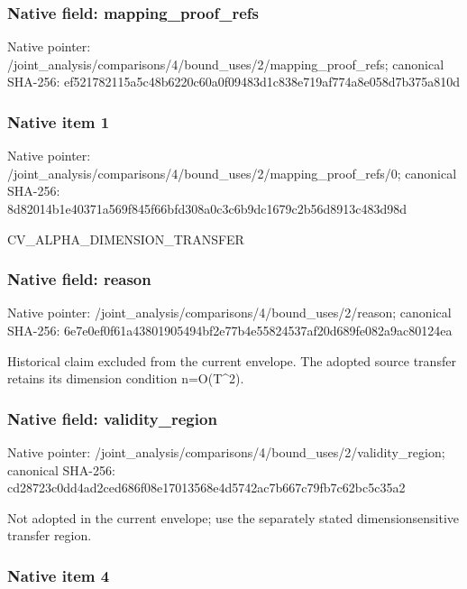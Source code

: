 \documentclass[10pt,a4paper]{article}
\begin{document}
\subsubsection{Native field: mapping\_proof\_refs}


Native pointer: /joint\_analysis/comparis\allowbreak{}ons/4/bound\_uses/2/mappi\allowbreak{}ng\_proof\_refs; canonical SHA-256: ef521782115a5c48b6220c60\allowbreak{}a0f09483d1c838e719af774a\allowbreak{}8e058d7b375a810d



\subsubsection{Native item 1}


Native pointer: /joint\_analysis/comparis\allowbreak{}ons/4/bound\_uses/2/mappi\allowbreak{}ng\_proof\_refs/0; canonical SHA-256: 8d82014b1e40371a569f845f\allowbreak{}66bfd308a0c3c6b9dc1679c2\allowbreak{}b56d8913c483d98d


CV\_ALPHA\_DIMENSION\_TRANSFER


\subsubsection{Native field: reason}


Native pointer: /joint\_analysis/comparis\allowbreak{}ons/4/bound\_uses/2/reaso\allowbreak{}n; canonical SHA-256: 6e7e0ef0f61a43801905494b\allowbreak{}f2e77b4e55824537af20d689\allowbreak{}fe082a9ac80124ea


Historical claim excluded from the current envelope. The adopted source transfer retains its dimension condition n=O(T\textasciicircum{}2).


\subsubsection{Native field: validity\_region}


Native pointer: /joint\_analysis/comparis\allowbreak{}ons/4/bound\_uses/2/valid\allowbreak{}ity\_region; canonical SHA-256: cd28723c0dd4ad2ced686f08\allowbreak{}e17013568e4d5742ac7b667c\allowbreak{}79fb7c62bc5c35a2


Not adopted in the current envelope; use the separately stated dimensionsensitive transfer region.


\subsubsection{Native item 4}
\end{document}
